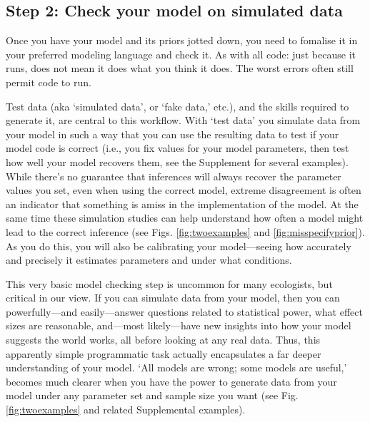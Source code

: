 \documentclass[11pt]{article}
\begin{document}
\subsection*{Step 2: Check your model on simulated data} 

Once you have your model and its priors jotted down, you need to fomalise it in your preferred modeling language and check it. As with all code: just because it runs, does not mean it does what you think it does. The worst errors often still permit code to run. %

Test data (aka `simulated data', or  `fake data,' etc.), and the skills required to generate it, are central to this workflow. With `test data' you simulate data from your model in such a way that you can use the resulting data to test if your model code is correct (i.e., you fix values for your model parameters, then test how well your model recovers them, see the Supplement for several examples). While there's no guarantee that inferences will always recover the parameter values you set, even when using the correct model, extreme disagreement is often an indicator that something is amiss in the implementation of the model. At the same time these simulation studies can help understand how often a model might lead to the correct inference (see Figs. \ref{fig:twoexamples} and \ref{fig:misspecifyprior}). As you do this, you will also be calibrating your model---seeing how accurately and precisely it estimates parameters and under what conditions. 

This very basic model checking step is uncommon for many ecologists, but critical in our view. If you can simulate data from your model, then you can powerfully---and easily---answer questions related to statistical power, what effect sizes are reasonable, and---most likely---have new insights into how your model suggests the world works, all before looking at any real data. Thus, this apparently simple programmatic task actually encapsulates a far deeper understanding of your model. `All models are wrong; some models are useful,' becomes much clearer when you have the power to generate data from your model under any parameter set and sample size you want (see Fig. \ref{fig:twoexamples} and related Supplemental examples).
\end{document}

